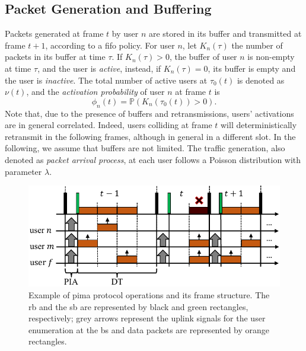 \documentclass[conference]{IEEEtran}
\begin{document}
\subsection{Packet Generation and Buffering}
Packets generated at frame $t$ by user $n$ are stored in its buffer and transmitted at frame $t+1$, according to a \ac{fifo} policy. For user $n$, let $K_n(\tau)$ the number of packets in its buffer at time $\tau$. 
If $K_n(\tau) > 0$, the buffer of user $n$ is non-empty at time $\tau$, and the user is \textit{active}, instead, if $K_n(\tau)= 0$, its buffer is empty and the user is  \textit{inactive}. The total number of active users at $\tau_0(t)$ is denoted as $\nu(t)$, and the \textit{activation probability} of user $n$ at frame $t$ is 
\begin{equation}
\phi_n(t) = \mathbb{P}(K_n(\tau_0(t))>0).
\end{equation}
Note that, due to the presence of buffers and retransmissions, users' activations are in general correlated. Indeed, users colliding at frame $t$ will deterministically retransmit in the following frames, although in general in a different slot.
In the following, we assume that buffers are not limited. The traffic generation, also denoted as {\em packet arrival process}, at each user follows a Poisson distribution with parameter $\lambda$.

\begin{figure}
    \centering
    \includegraphics[width=\columnwidth]{figs/PIMA_GLOBECOM_fig.pdf}
    \caption{Example of \ac{pima} protocol operations and its frame structure. The \ac{rb} and the \ac{sb} are represented by black and green rectangles, respectively; grey arrows represent the uplink signals for the user enumeration at the \ac{bs} and data packets are represented by orange rectangles.}
    \label{fig:PIMAframe}
    \vspace{-5pt}
\end{figure}
\end{document}
